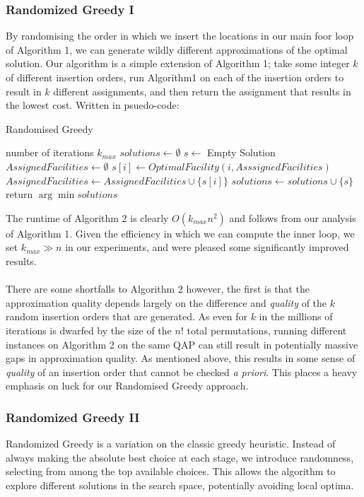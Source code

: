 \documentclass[a4paper,10pt]{article}
\begin{document}
\subsubsection*{Randomized Greedy I}
By randomising the order in which we insert the locations in our main foor loop of Algorithm 1, we can generate wildly different approximations of the optimal solution. Our algorithm is a simple extension of Algorithm 1; take some integer $k$ of different insertion orders, run Algorithm1 on each of the insertion orders to result in $k$ different assignments, and then return the assignment that results in the lowest cost. Written in psuedo-code: 

\begin{algorithm}
\caption{Randomised Greedy}\label{alg:cap}
\begin{algorithmic}
\Require number of iterations $k_{max}$
\State $solutions\gets \emptyset$
\State $s \gets $ Empty Solution
\State $Assigned Facilities \gets \emptyset$
    \State $s[i] \gets OptimalFacility(i, AsssignedFacilities)$
    \State $AssignedFacilities \gets AssignedFacilities \cup \{s[i]\}$
\EndFor
\State $solutions \gets solutions \cup \{s\}$
\EndFor
\State return $\arg \min solutions$
\end{algorithmic}
\end{algorithm}
The runtime of Algorithm 2 is clearly $O(k_{max}n^2)$ and follows from our analysis of Algorithm 1. Given the efficiency in which we can compute the inner loop, we set $k_{max}\gg n$ in our experiments, and were pleased some significantly improved results. \\
\\
There are some shortfalls to Algorithm 2 however, the first is that the approximation quality depends largely on the difference and \textit{quality} of the $k$ random insertion orders that are generated. As even for $k$ in the millions of iterations is dwarfed by the size of the $n!$ total permutations, running different instances on Algorithm 2 on the same QAP can still result in potentially massive gaps in approximation quality. As mentioned above, this results in some sense of \textit{quality} of an insertion order that cannot be checked \textit{a priori}. This places a heavy emphasis on luck for our Randomised Greedy approach. 

\subsubsection*{Randomized Greedy II}
Randomized Greedy is a variation on the classic greedy heuristic. Instead of always making the absolute best choice at each stage, we introduce randomness, selecting from among the top available choices. This allows the algorithm to explore different solutions in the search space, potentially avoiding local optima.
\end{document}
